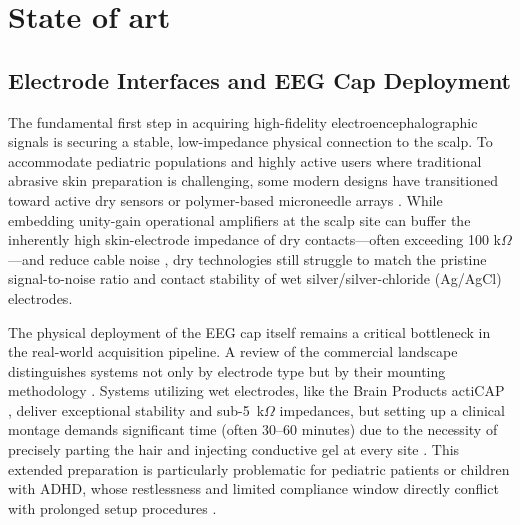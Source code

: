 \section{State of art}\label{sec:stateofart}

\subsection{Electrode Interfaces and EEG Cap Deployment}

The fundamental first step in acquiring high-fidelity electroencephalographic signals is securing a stable, low-impedance physical connection to the scalp. To accommodate pediatric populations and highly active users where traditional abrasive skin preparation is challenging, some modern designs have transitioned toward active dry sensors or polymer-based microneedle arrays \cite{liu2024multichannel, kim2024skin}. While embedding unity-gain operational amplifiers at the scalp site can buffer the inherently high skin-electrode impedance of dry contacts—often exceeding 100 k$\Omega$ \cite{xiong2025advancements}—and reduce cable noise \cite{giangrande2024motion}, dry technologies still struggle to match the pristine signal-to-noise ratio and contact stability of wet silver/silver-chloride (Ag/AgCl) electrodes.

The physical deployment of the EEG cap itself remains a critical bottleneck in the real-world acquisition pipeline. A review of the commercial landscape distinguishes systems not only by electrode type but by their mounting methodology \cite{petrossian2023advances}. Systems utilizing wet electrodes, like the Brain Products actiCAP \cite{BrainProducts_ActiCap}, deliver exceptional stability and sub-5~k$\Omega$ impedances, but setting up a clinical montage demands significant time (often 30--60 minutes) due to the necessity of precisely parting the hair and injecting conductive gel at every site \cite{niso2023wireless}. This extended preparation is particularly problematic for pediatric patients or children with ADHD, whose restlessness and limited compliance window directly conflict with prolonged setup procedures \cite{Lim2023}.

